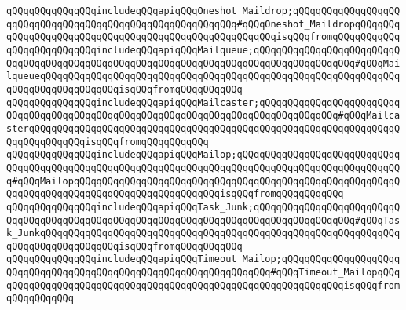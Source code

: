 \verb|qQQqqQQqqQQqqQQqincludeqQQqapiqQQqOneshot_Maildrop;qQQqqQQqqQQqqQQqqQQqqQQqqQQqqQQqqQQqqQQqqQQqqQQqqQQqqQQqqQQq#qQQqOneshot_MaildropqQQqqQQqqQQqqQQqqQQqqQQqqQQqqQQqqQQqqQQqqQQqqQQqqQQqqQQqisqQQqfromqQQqqQQqqQQq|\newline
\verb|qQQqqQQqqQQqqQQqincludeqQQqapiqQQqMailqueue;qQQqqQQqqQQqqQQqqQQqqQQqqQQqqQQqqQQqqQQqqQQqqQQqqQQqqQQqqQQqqQQqqQQqqQQqqQQqqQQqqQQqqQQq#qQQqMailqueueqQQqqQQqqQQqqQQqqQQqqQQqqQQqqQQqqQQqqQQqqQQqqQQqqQQqqQQqqQQqqQQqqQQqqQQqqQQqqQQqqQQqisqQQqfromqQQqqQQqqQQq|\newline
\verb|qQQqqQQqqQQqqQQqincludeqQQqapiqQQqMailcaster;qQQqqQQqqQQqqQQqqQQqqQQqqQQqqQQqqQQqqQQqqQQqqQQqqQQqqQQqqQQqqQQqqQQqqQQqqQQqqQQqqQQq#qQQqMailcasterqQQqqQQqqQQqqQQqqQQqqQQqqQQqqQQqqQQqqQQqqQQqqQQqqQQqqQQqqQQqqQQqqQQqqQQqqQQqqQQqisqQQqfromqQQqqQQqqQQq|\newline
\verb|qQQqqQQqqQQqqQQqincludeqQQqapiqQQqMailop;qQQqqQQqqQQqqQQqqQQqqQQqqQQqqQQqqQQqqQQqqQQqqQQqqQQqqQQqqQQqqQQqqQQqqQQqqQQqqQQqqQQqqQQqqQQqqQQqqQQq#qQQqMailopqQQqqQQqqQQqqQQqqQQqqQQqqQQqqQQqqQQqqQQqqQQqqQQqqQQqqQQqqQQqqQQqqQQqqQQqqQQqqQQqqQQqqQQqqQQqqQQqisqQQqfromqQQqqQQqqQQq|\newline
\verb|qQQqqQQqqQQqqQQqincludeqQQqapiqQQqTask_Junk;qQQqqQQqqQQqqQQqqQQqqQQqqQQqqQQqqQQqqQQqqQQqqQQqqQQqqQQqqQQqqQQqqQQqqQQqqQQqqQQqqQQqqQQq#qQQqTask_JunkqQQqqQQqqQQqqQQqqQQqqQQqqQQqqQQqqQQqqQQqqQQqqQQqqQQqqQQqqQQqqQQqqQQqqQQqqQQqqQQqqQQqisqQQqfromqQQqqQQqqQQq|\newline
\verb|qQQqqQQqqQQqqQQqincludeqQQqapiqQQqTimeout_Mailop;qQQqqQQqqQQqqQQqqQQqqQQqqQQqqQQqqQQqqQQqqQQqqQQqqQQqqQQqqQQqqQQqqQQq#qQQqTimeout_MailopqQQqqQQqqQQqqQQqqQQqqQQqqQQqqQQqqQQqqQQqqQQqqQQqqQQqqQQqqQQqqQQqisqQQqfromqQQqqQQqqQQq|\newline
